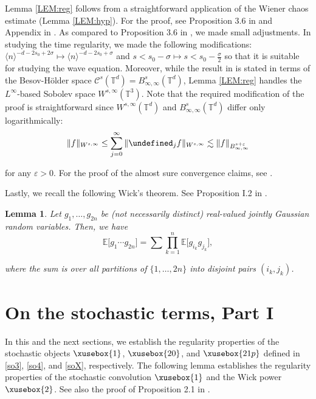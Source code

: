 \documentclass[%
11pt,  reqno]{amsart}
\def\<#1>{\xusebox{#1}}
\newtheorem{lemma}[theorem]{Lemma}
\newcommand{\1}{\hspace{0.2mm}\text{I}\hspace{0.2mm}}
\newcommand{\noi}{\noindent}
\newcommand{\T}{\mathbb{T}}
\let\P= \undefined
\newcommand{\P}{\mathbf{P}}
\newcommand{\E}{\mathbb{E}}
\newcommand{\eps}{\varepsilon}
\newcommand{\s}{\sigma}
\newcommand{\les}{\lesssim}
\newcommand{\jb}[1]
{\langle #1 \rangle}
\numberwithin{equation}{section}
\numberwithin{theorem}{section}
\begin{document}
Lemma \ref{LEM:reg} follows
from a straightforward application of the Wiener chaos estimate
(Lemma \ref{LEM:hyp}).
For the proof, see Proposition 3.6 in \cite{MWX}
and  Appendix in \cite{OTzW}.
As compared to  Proposition 3.6 in \cite{MWX}, 
we made small adjustments.
In studying the time regularity, we 
made the following modifications:
$\jb{n}^{ - d - 2s_0+ 2\s}\mapsto\jb{n}^{ - d - 2s_0+ \s}$
and $s < s_0 - \s \mapsto s < s_0 - \frac \s2$  
so that it is suitable
for studying  the wave equation.
Moreover, while the result in \cite{MWX} is stated in terms of the
Besov-H\"older space $\mathcal{C}^s(\T^d) = B^s_{\infty, \infty}(\T^d)$, 
Lemma \ref{LEM:reg} handles the $L^\infty$-based Sobolev space $W^{s, \infty}(\T^3)$.
Note that 
the required modification of the proof is straightforward
since $W^{s, \infty}(\T^d)$ and $B^s_{\infty, \infty}(\T^d)$
differ only logarithmically:
\[ \| f \|_{W^{s, \infty}} \leq 
\sum_{j = 0}^\infty
 \|\P_j f \|_{W^{s, \infty}}
 \les \| f\|_{B^{s+\eps}_{\infty, \infty}}\]

\noi
for any $\eps > 0$.
For the proof of the almost sure convergence claims, 
see \cite{OTzW}.










Lastly, we recall the following Wick's theorem.
See Proposition I.2 in \cite{Simon}.

\begin{lemma}\label{LEM:Wick}	
Let $g_1, \dots, g_{2n}$ be \textup{(}not necessarily distinct\textup{)}
 real-valued jointly Gaussian random variables.
Then, we have
\[ \E\big[ g_1 \cdots g_{2n}\big]
= \sum  \prod_{k = 1}^n \E\big[g_{i_k} g_{j_k} \big], 
\]


\noi
where the sum is over all partitions of $\{1, \dots, 2 n\}$
into disjoint pairs $(i_k, j_k)$.
\end{lemma}









\section{On the stochastic terms, Part I}
\label{SEC:sto1}

In this and the next sections, 
we establish the regularity properties
of the stochastic objects 
$\<1>$, $\<20>$, and $\<21p>$ defined in \eqref{so3},
\eqref{so4}, and \eqref{soX}, respectively.
The following lemma establishes the regularity properties
of the stochastic convolution $\<1>$ and the Wick power $\<2>$.
See also the proof of Proposition 2.1 in \cite{GKO}.
\end{document}
